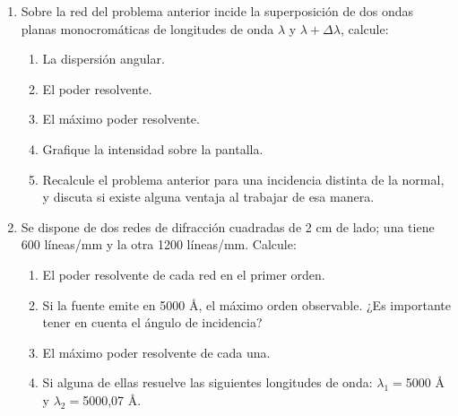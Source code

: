 \documentclass[11pt,spanish,a4paper]{article}
\begin{document}
\begin{enumerate}
\item Sobre la red del problema anterior incide la superposición de dos
ondas planas monocromáticas de longitudes de onda $\lambda$ y $\lambda+\Delta\lambda$,
calcule: 
\begin{enumerate}
\item La dispersión angular.
\item El poder resolvente.
\item El máximo poder resolvente. 
\item Grafique la intensidad sobre la pantalla. 
\item Recalcule el problema anterior para una incidencia distinta de la
normal, y discuta si existe alguna ventaja al trabajar de esa manera. 
\end{enumerate}


\item Se dispone de dos redes de difracción cuadradas de 2 cm de lado; una
tiene 600 líneas/mm y la otra 1200 líneas/mm. Calcule: 
\begin{enumerate}
\item El poder resolvente de cada red en el primer orden. 
\item Si la fuente emite en 5000 Å, el máximo orden observable. ¿Es importante
tener en cuenta el ángulo de incidencia? 
\item El máximo poder resolvente de cada una. 
\item Si alguna de ellas resuelve las siguientes longitudes de onda: $\lambda_{1}=$5000
Å y $\lambda_{2}=$5000,07 Å.
\end{enumerate}



\end{enumerate}
\end{document}
